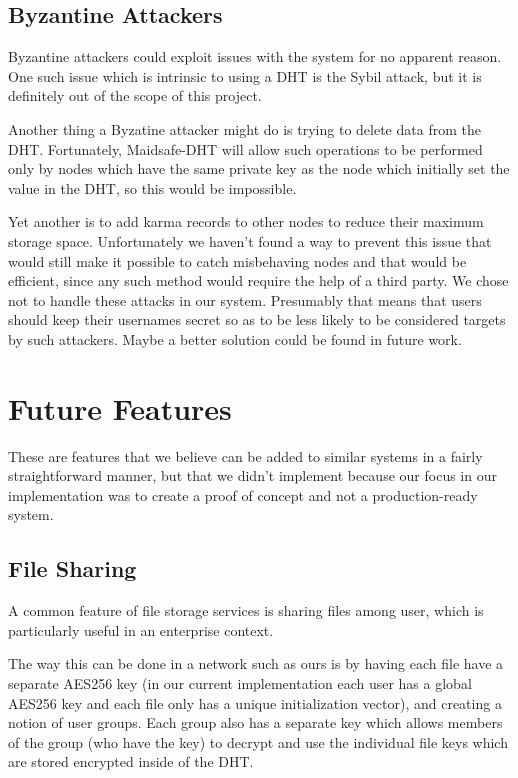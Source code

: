 \documentclass[11pt]{IEEEtran}
\begin{document}
\subsection{Byzantine Attackers}

Byzantine attackers could exploit issues with the system for no apparent reason. One such issue which is intrinsic to using a DHT is the Sybil attack\cite{sybil}, but it is definitely out of the scope of this project. 

Another thing a Byzatine attacker might do is trying to delete data from the DHT. Fortunately, Maidsafe-DHT will allow such operations to be performed only by nodes which have the same private key as the node which initially set the value in the DHT, so this would be impossible.

Yet another is to add karma records to other nodes to reduce their maximum storage space. Unfortunately we haven't found a way to prevent this issue that would still make it possible to catch misbehaving nodes and that would be efficient, since any such method would require the help of a third party. We chose not to handle these attacks in our system. Presumably that means that users should keep their usernames secret so as to be less likely to be considered targets by such attackers. Maybe a better solution could be found in future work.

\section{Future Features}

These are features that we believe can be added to similar systems in a fairly straightforward manner, but that we didn't implement because our focus in our implementation was to create a proof of concept and not a production-ready system.

\subsection{File Sharing}

A common feature of file storage services is sharing files among user, which is particularly useful in an enterprise context. 

The way this can be done in a network such as ours is by having each file have a separate AES256 key (in our current implementation each user has a global AES256 key and each file only has a unique initialization vector), and creating a notion of user groups. Each group also has a separate key which allows members of the group (who have the key) to decrypt and use the individual file keys which are stored encrypted inside of the DHT.
\end{document}
